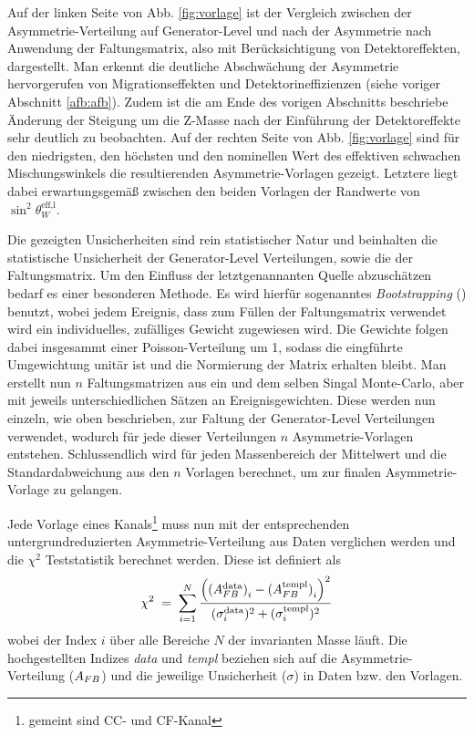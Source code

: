 Auf der linken Seite von Abb. \ref{fig:vorlage} ist der Vergleich zwischen der
Asymmetrie-Verteilung auf Generator-Level und nach der Asymmetrie nach
Anwendung der Faltungsmatrix, also mit Berücksichtigung von Detektoreffekten,
dargestellt. Man erkennt die deutliche Abschwächung der Asymmetrie
hervorgerufen von Migrationseffekten und Detektorineffizienzen (siehe voriger
Abschnitt \ref{afb:afb}). Zudem ist die am Ende des vorigen Abschnitts
beschriebe Änderung der Steigung um die Z-Masse nach der Einführung der
Detektoreffekte sehr deutlich zu beobachten. Auf der rechten Seite von Abb.
\ref{fig:vorlage} sind für den niedrigsten, den höchsten und den nominellen
Wert des effektiven schwachen Mischungswinkels die resultierenden
Asymmetrie-Vorlagen gezeigt. Letztere liegt dabei erwartungsgemäß zwischen den
beiden Vorlagen der Randwerte von $\sin^2\theta_W^\text{eff,l}$.

Die gezeigten Unsicherheiten sind rein statistischer Natur und beinhalten die
statistische Unsicherheit der Generator-Level Verteilungen, sowie die der
Faltungsmatrix. Um den Einfluss der
letztgenannanten Quelle abzuschätzen bedarf es einer besonderen Methode. Es
wird hierfür sogenanntes \textit{Bootstrapping} (\cite{zbMATH03631774})
benutzt, wobei jedem Ereignis, dass zum Füllen der Faltungsmatrix verwendet
wird ein individuelles, zufälliges Gewicht zugewiesen wird. Die Gewichte
folgen dabei insgesammt einer Poisson-Verteilung um 1, sodass die eingführte
Umgewichtung unitär ist und die Normierung der Matrix erhalten bleibt. Man
erstellt nun $n$ Faltungsmatrizen aus ein und dem selben Singal Monte-Carlo,
aber mit jeweils unterschiedlichen Sätzen an Ereignisgewichten.
Diese werden nun einzeln, wie oben beschrieben, zur Faltung der Generator-Level
Verteilungen verwendet, wodurch für jede dieser Verteilungen $n$
Asymmetrie-Vorlagen entstehen. Schlussendlich wird für jeden Massenbereich der
Mittelwert und die Standardabweichung aus den $n$ Vorlagen berechnet, um zur
finalen Asymmetrie-Vorlage zu gelangen.

Jede Vorlage eines Kanals\footnote{gemeint sind \ac{CC}- und \ac{CF}-Kanal}
muss nun mit der entsprechenden untergrundreduzierten Asymmetrie-Verteilung aus
Daten verglichen werden und die $\chi^2$ Teststatistik berechnet werden. Diese
ist definiert als
\begin{equation}
    \chi^2 \;=\; \sum_{i=1}^{N}
        \frac{
            \left(
                {(A_{FB}^\text{data})}_i - {(A_{FB}^\text{templ})}_i
            \right)^2
        }{
            (\sigma_i^\text{data})^2 + (\sigma_i^\text{templ})^2
        }
\end{equation}
wobei der Index $i$ über alle Bereiche $N$ der invarianten Masse läuft. Die
hochgestellten Indizes \textit{data} und \textit{templ} beziehen sich auf die
Asymmetrie-Verteilung ($A_{FB}$) und die jeweilige Unsicherheit ($\sigma$) in
Daten bzw. den Vorlagen.



